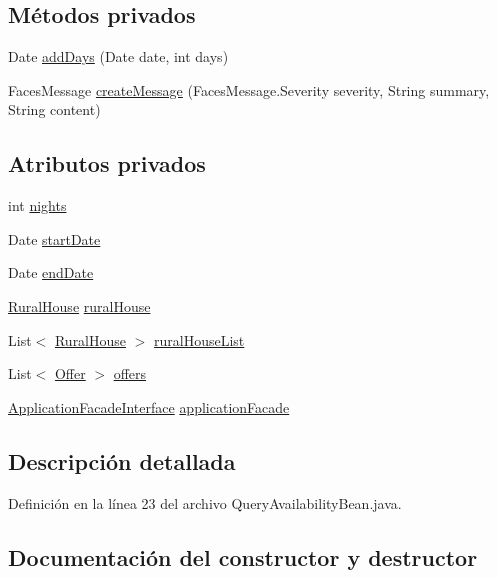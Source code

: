 \subsection*{Métodos privados}
\begin{DoxyCompactItemize}
\item 
Date \mbox{\hyperlink{a00224_a12d19b646905551923788bedc60f1ff7}{add\+Days}} (Date date, int days)
\item 
Faces\+Message \mbox{\hyperlink{a00224_a0f1bb887ac4c3b90551c76fb51ba9253}{create\+Message}} (Faces\+Message.\+Severity severity, String summary, String content)
\end{DoxyCompactItemize}
\subsection*{Atributos privados}
\begin{DoxyCompactItemize}
\item 
int \mbox{\hyperlink{a00224_a4b06a08eab621f9fd6bf50ea4ae78a84}{nights}}
\item 
Date \mbox{\hyperlink{a00224_a1652bdd9864dc46b9c0fb5e31282032d}{start\+Date}}
\item 
Date \mbox{\hyperlink{a00224_ab8a7c45b5539243a1d4f82bc5ae24305}{end\+Date}}
\item 
\mbox{\hyperlink{a00188}{Rural\+House}} \mbox{\hyperlink{a00224_af0ec1e1e555ba7aecce40e6b7afb35e9}{rural\+House}}
\item 
List$<$ \mbox{\hyperlink{a00188}{Rural\+House}} $>$ \mbox{\hyperlink{a00224_aa73f1afe950fffe89af77ce0d5a46b70}{rural\+House\+List}}
\item 
List$<$ \mbox{\hyperlink{a00184}{Offer}} $>$ \mbox{\hyperlink{a00224_ab3faff791db6f04e1630faf15e6d4b6c}{offers}}
\item 
\mbox{\hyperlink{a00136}{Application\+Facade\+Interface}} \mbox{\hyperlink{a00224_a0833a1cf9f0fdaa8301cccae085eead4}{application\+Facade}}
\end{DoxyCompactItemize}


\subsection{Descripción detallada}


Definición en la línea 23 del archivo Query\+Availability\+Bean.\+java.



\subsection{Documentación del constructor y destructor}
\mbox{\label{a00224_a774769b2abae9a936441fcb0221f3cde}} 
